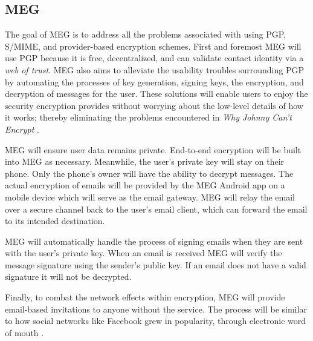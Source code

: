 \documentclass{sig-alternate-05-2015}
\begin{document}
\subsection{MEG}
\par The goal of MEG is to address all the problems associated with using PGP, S/MIME, and provider-based encryption schemes. First and foremost MEG will use PGP because it is free, decentralized, and can validate contact identity via a \textit{web of trust}. MEG also aims to alleviate the usability troubles surrounding PGP by automating the processes of key generation, signing keys, the encryption, and decryption of messages for the user. These solutions will enable users to enjoy the security encryption provides without worrying about the low-level details of how it works; thereby eliminating the problems encountered in \textit{Why Johnny Can't Encrypt} \cite{whitten1999johnny}.
\par MEG will ensure user data remains private. End-to-end encryption will be built into MEG as necessary. Meanwhile, the user's private key will stay on their phone. Only the phone's owner will have the ability to decrypt messages. The actual encryption of emails will be provided by the MEG Android app on a mobile device which will serve as the email gateway. MEG will relay the email over a secure channel back to the user's email client, which can forward the email to its intended destination.
\par MEG will automatically handle the process of signing emails when they are sent with the user's private key. When an email is received MEG will verify the message signature using the sender's public key. If an email does not have a valid signature it will not be decrypted.
\par Finally, to combat the network effects within encryption, MEG will provide email-based invitations to anyone without the service. The process will be similar to how social networks like Facebook grew in popularity, through electronic word of mouth \cite{trusov2009effects}.
\end{document}
